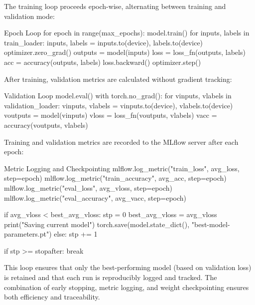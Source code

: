 The training loop proceeds epoch-wise, alternating between training and validation mode:

\begin{codeonly}{Epoch Loop}
for epoch in range(max_epochs):
    model.train()
    for inputs, labels in train_loader:
        inputs, labels = inputs.to(device), labels.to(device)
        optimizer.zero_grad()
        outputs = model(inputs)
        loss = loss_fn(outputs, labels)
        acc  = accuracy(outputs, labels)
        loss.backward()
        optimizer.step()
\end{codeonly}

After training, validation metrics are calculated without gradient tracking:

\begin{codeonly}{Validation Loop}
    model.eval()
    with torch.no_grad():
        for vinputs, vlabels in validation_loader:
            vinputs, vlabels = vinputs.to(device), vlabels.to(device)
            voutputs = model(vinputs)
            vloss    = loss_fn(voutputs, vlabels)
            vacc     = accuracy(voutputs, vlabels)
\end{codeonly}

Training and validation metrics are recorded to the MLflow server after each epoch:

\begin{codeonly}{Metric Logging and Checkpointing}
    mlflow.log_metric("train_loss",     avg_loss,  step=epoch)
    mlflow.log_metric("train_accuracy", avg_acc,   step=epoch)
    mlflow.log_metric("eval_loss",      avg_vloss, step=epoch)
    mlflow.log_metric("eval_accuracy",  avg_vacc,  step=epoch)

    if avg_vloss < best_avg_vloss:
        stp = 0
        best_avg_vloss = avg_vloss
        print("Saving current model")
        torch.save(model.state_dict(), "best-model-parameters.pt")
    else:
        stp += 1

    if stp >= stopafter:
        break
\end{codeonly}

This loop ensures that only the best-performing model (based on validation loss) is retained and that each run is reproducibly logged and tracked. The combination of early stopping, metric logging, and weight checkpointing ensures both efficiency and traceability.



